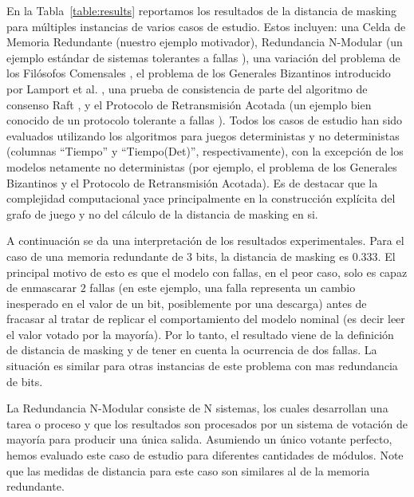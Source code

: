 En la Tabla~\ref{table:results} reportamos los resultados de la distancia de masking para múltiples instancias de varios casos de estudio. Estos incluyen: una Celda de Memoria Redundante (nuestro ejemplo motivador), Redundancia N-Modular (un ejemplo estándar de sistemas tolerantes a fallas \cite{ShoomanBook}), una variación del problema de los Filósofos Comensales \cite{Dijkstra71}, el problema de los Generales Bizantinos introducido por Lamport et al. \cite{LamportSP82}, una prueba de consistencia de parte del algoritmo de consenso Raft \cite{OngaroO14}, y el Protocolo de Retransmisión Acotada (un ejemplo bien conocido de un protocolo tolerante a fallas \cite{GrooteP96}). Todos los casos de estudio han sido evaluados utilizando los algoritmos para juegos deterministas y no deterministas (columnas ``Tiempo'' y ``Tiempo(Det)'', respectivamente), con la excepción de los modelos netamente no deterministas (por ejemplo, el problema de los Generales Bizantinos y el Protocolo de Retransmisión Acotada). Es de destacar que la complejidad computacional yace principalmente en la construcción explícita del grafo de juego y no del cálculo de la distancia de masking en si.

A continuación se da una interpretación de los resultados experimentales. Para el caso de una memoria redundante de $3$ bits, la distancia de masking es $0.333$. El principal motivo de esto es que el modelo con fallas, en el peor caso, solo es capaz de enmascarar $2$ fallas (en este ejemplo, una falla representa un cambio inesperado en el valor de un bit, posiblemente por una descarga) antes de fracasar al tratar de replicar el comportamiento del modelo nominal (es decir leer el valor votado por la mayoría). Por lo tanto, el resultado viene de la definición de distancia de masking y de tener en cuenta la ocurrencia de dos fallas. La situación es similar para otras instancias de este problema con mas redundancia de bits.

La Redundancia N-Modular consiste de N sistemas, los cuales desarrollan una tarea o proceso y que los resultados son procesados por un sistema de votación de mayoría para producir una única salida. 
Asumiendo un único votante perfecto, hemos evaluado este caso de estudio para diferentes cantidades de módulos.
Note que las medidas de distancia para este caso son similares al de la memoria redundante. 

